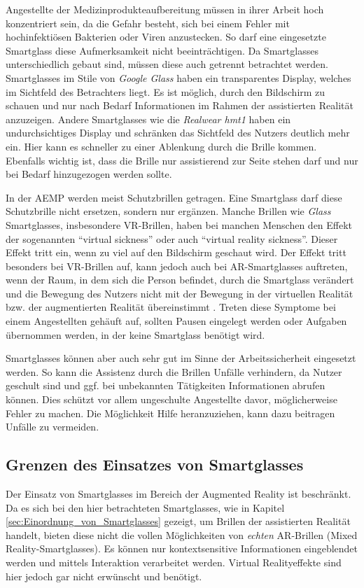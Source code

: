Angestellte der Medizinprodukteaufbereitung müssen in ihrer Arbeit hoch konzentriert sein, da die Gefahr besteht, sich bei einem Fehler mit hochinfektiösen Bakterien oder Viren anzustecken. So darf eine eingesetzte Smartglass diese Aufmerksamkeit nicht beeinträchtigen. Da Smartglasses unterschiedlich gebaut sind, müssen diese auch getrennt betrachtet werden. Smartglasses im Stile von \emph{Google Glass} haben ein transparentes Display, welches im Sichtfeld des Betrachters liegt. Es ist möglich, durch den Bildschirm zu schauen und nur nach Bedarf Informationen im Rahmen der assistierten Realität anzuzeigen. Andere Smartglasses wie die \emph{Realwear hmt1} haben ein undurchsichtiges Display und schränken das Sichtfeld des Nutzers deutlich mehr ein. Hier kann es schneller zu einer Ablenkung durch die Brille kommen. Ebenfalls wichtig ist, dass die Brille nur assistierend zur Seite stehen darf und nur bei Bedarf hinzugezogen werden sollte.

In der AEMP werden meist Schutzbrillen getragen. Eine Smartglass darf diese Schutzbrille nicht ersetzen, sondern nur ergänzen. Manche Brillen wie \emph{Glass} Smartglasses, insbesondere VR-Brillen, haben bei manchen Menschen den Effekt der sogenannten \enquote{virtual sickness} oder auch \enquote{virtual reality sickness}. Dieser Effekt tritt ein, wenn zu viel auf den Bildschirm geschaut wird. Der Effekt tritt besonders bei VR-Brillen auf, kann jedoch auch bei AR-Smartglasses auftreten, wenn der Raum, in dem sich die Person befindet, durch die Smartglass verändert und die Bewegung des Nutzers nicht mit der Bewegung in der virtuellen Realität bzw. der augmentierten Realität übereinstimmt \cite{Moss2011}. Treten diese Symptome bei einem Angestellten gehäuft auf, sollten Pausen eingelegt werden oder Aufgaben übernommen werden, in der keine Smartglass benötigt wird.

Smartglasses können aber auch sehr gut im Sinne der Arbeitssicherheit eingesetzt werden. So kann die Assistenz durch die Brillen Unfälle verhindern, da Nutzer geschult sind und ggf. bei unbekannten Tätigkeiten Informationen abrufen können. Dies schützt vor allem ungeschulte Angestellte davor, möglicherweise  Fehler zu machen. Die Möglichkeit Hilfe heranzuziehen, kann dazu beitragen Unfälle zu vermeiden.
%
%
%
%
%
%
\subsection{Grenzen des Einsatzes von Smartglasses}
\label{sec:Grenzen_des_Einsatzes_von_Smartglasses}
Der Einsatz von Smartglasses im Bereich der Augmented Reality ist beschränkt. Da es sich bei den hier betrachteten Smartglasses, wie in Kapitel \ref{sec:Einordnung_von_Smartglasses} gezeigt, um Brillen der assistierten Realität handelt, bieten diese nicht die vollen Möglichkeiten von \emph{echten} AR-Brillen (Mixed Reality-Smartglasses). Es können nur kontextsensitive Informationen eingeblendet werden und mittels Interaktion verarbeitet werden. Virtual Realityeffekte sind hier jedoch gar nicht erwünscht und benötigt.

